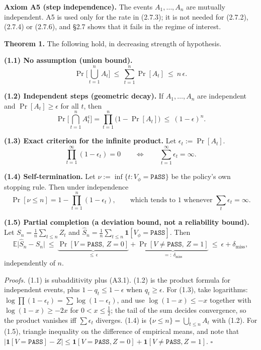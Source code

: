 \documentclass[11pt,a4paper]{article}
\begin{document}
\textbf{Axiom A5 (step independence).} The events \(A_1,\dots,A_n\) are mutually
independent. A5 is used only for the rate in (2.7.3); it is not needed for
(2.7.2), (2.7.4) or (2.7.6), and §2.7 shows that it fails in the regime of
interest.

\textbf{Theorem 1.} The following hold, in decreasing strength of hypothesis.

\textbf{(1.1) No assumption (union bound).}
\begin{equation}
\Pr\Big[\bigcup_{t=1}^{n}A_t\Big]\ \le\ \sum_{t=1}^{n}\Pr[A_t]\ \le\ n\,\epsilon .
\tag{2.7.2}
\end{equation}

\textbf{(1.2) Independent steps (geometric decay).} If \(A_1,\dots,A_n\) are independent
and \(\Pr[A_t]\ge\epsilon\) for all \(t\), then
\begin{equation}
\Pr\Big[\bigcap_{t=1}^{n}A_t^{\mathsf c}\Big]
=\prod_{t=1}^{n}\big(1-\Pr[A_t]\big)\ \le\ (1-\epsilon)^{n}.
\tag{2.7.3}
\end{equation}

\textbf{(1.3) Exact criterion for the infinite product.} Let \(\epsilon_t:=\Pr[A_t]\).
\begin{equation}
\prod_{t=1}^{\infty}(1-\epsilon_t)=0
\qquad\Longleftrightarrow\qquad
\sum_{t=1}^{\infty}\epsilon_t=\infty .
\tag{2.7.4}
\end{equation}

\textbf{(1.4) Self-termination.} Let \(\nu:=\inf\{t: V_\phi=\texttt{PASS}\}\) be the
policy's own stopping rule. Then under independence
\begin{equation}
\Pr[\nu\le n]=1-\prod_{t=1}^{n}(1-\epsilon_t),
\qquad\text{which tends to }1\text{ whenever }\textstyle\sum_t\epsilon_t=\infty .
\tag{2.7.5}
\end{equation}

\textbf{(1.5) Partial completion (a deviation bound, not a reliability bound).} Let
\(S_n=\frac1n\sum_{t\le n}Z_t\) and \(\hat S_n=\frac1n\sum_{t\le n}\mathbf{1}[V_\phi=\texttt{PASS}]\).
Then
\begin{equation}
\mathbb E\big|\hat S_n-S_n\big|
\ \le\ \underbrace{\Pr[V=\texttt{PASS},\,Z=0]}_{\le\,\epsilon}
+\underbrace{\Pr[V\ne\texttt{PASS},\,Z=1]}_{=:\ \delta_{\mathrm{miss}}}
\ \le\ \epsilon+\delta_{\mathrm{miss}},
\tag{2.7.6}
\end{equation}
independently of \(n\).

\emph{Proofs.} (1.1) is subadditivity plus (A3.1). (1.2) is the product formula for
independent events, plus \(1-q_t\le1-\epsilon\) when \(q_t\ge\epsilon\). For (1.3),
take logarithms: \(\log\prod(1-\epsilon_t)=\sum\log(1-\epsilon_t)\), and use
\(\log(1-x)\le-x\) together with \(\log(1-x)\ge-2x\) for \(0<x\le\frac12\); the tail of
the sum decides convergence, so the product vanishes iff \(\sum\epsilon_t\)
diverges. (1.4) is \(\{\nu\le n\}=\bigcup_{t\le n}A_t\) with (1.2). For (1.5),
triangle inequality on the difference of empirical means, and note that
\(|\mathbf{1}[V=\texttt{PASS}]-Z|\le\mathbf{1}[V=\texttt{PASS},Z=0]+\mathbf{1}[V\ne\texttt{PASS},Z=1]\).
\(\square\)
\end{document}
